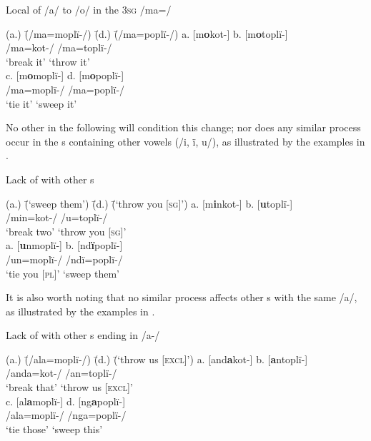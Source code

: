 \ea%
    \label{ex:phon:83}
          Local   of /a/ to /o/ in the 3\textsc{sg}  /ma=/
\begin{tabbing}    
{(a.)} \= {(/ma=moplï-/)} \= {(d.)} \= {(/ma=poplï-/)}\kill
{a.} \> {[m\textbf{o}kot-]} \> {b.} \> {[m\textbf{o}toplï-]}\\
{ } \> {/ma=kot-/} \> { } \> {/ma=toplï-/}\\
{ } \> {‘break it’} \> { } \> {‘throw it’}\\
{c.} \> {[m\textbf{o}moplï-]} \> {d.} \> {[m\textbf{o}poplï-]}\\
{ } \> {/ma=moplï-/} \> { } \> {/ma=poplï-/}\\
{ } \> {‘tie it’} \> { } \> {‘sweep it’}
\end{tabbing}
\z

No other  in the following  will condition this change; nor does any similar process occur in the s containing other vowels (/i, ï, u/), as illustrated by the examples in .

\ea%
    \label{ex:phon:84}
          Lack of   with other s\\
\begin{tabbing}    
{(a.)} \= {(‘sweep them’)} \= {(d.)} \= {(‘throw you [\textsc{sg}]’)}\kill
{a.} \> {[m\textbf{i}nkot-]} \> {b.} \> {[\textbf{u}toplï-]}\\
{ } \> {/min=kot-/} \> { } \> {/u=toplï-/}\\
{ } \> {‘break two’} \> { } \> {‘throw you [\textsc{sg}]’}\\
{a.} \> {[\textbf{u}nmoplï-]} \> {b.} \> {[nd\textbf{ï}poplï-]}\\  
{ } \> {/un=moplï-/} \> { } \> {/ndï=poplï-/}\\
{ } \> {‘tie you [\textsc{pl}]’} \> { } \> {‘sweep them’}
\end{tabbing}  
\z

It is also worth noting that no similar process affects other s with the same  /a/, as illustrated by the examples in .

\newpage

\ea%
    \label{ex:phon:85}
          Lack of   with other s ending in /a-/\\
\begin{tabbing}
{(a.)} \= {(/ala=moplï-/)} \= {(d.)} \= {(‘throw us [\textsc{excl}]’)}\kill
{a.} \> {[and\textbf{a}kot-]} \> {b.} \> {[\textbf{a}ntoplï-]}\\
{ } \> {/anda=kot-/} \> { } \> {/an=toplï-/}\\
{ } \> {‘break that’} \> { } \> {‘throw us [\textsc{excl}]’}\\
{c.} \> {[al\textbf{a}moplï-]} \> {d.} \> {[ng\textbf{a}poplï-]}\\
 { } \> {/ala=moplï-/} \> { } \> {/nga=poplï-/}\\
{ } \> {‘tie those’} \> { } \> {‘sweep this’}     
\end{tabbing}
\z

